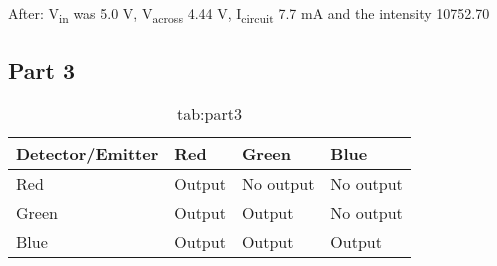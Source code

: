 After: V\textsubscript{in} was 5.0 V, V\textsubscript{across} 4.44 V, I\textsubscript{circuit} 7.7 mA and the intensity 10752.70


\subsection{Part 3}

\begin{table}[H]
    \centering
    \begin{tabular}{@{}llll@{}}
    \toprule
    Detector/Emitter & Red    & Green     & Blue      \\ \midrule
    Red              & Output & No output & No output \\
    Green            & Output & Output    & No output \\
    Blue             & Output & Output    & Output    \\ \bottomrule
    \end{tabular}
    \caption{tab:part3}
\end{table}